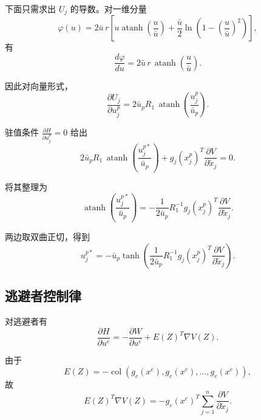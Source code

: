 \documentclass[12pt,a4paper]{ctexart}
\begin{document}
下面只需求出 $U_j$ 的导数。对一维分量
\begin{equation}
\varphi(u)
=
2\bar u\,r
\left[
u\operatorname{atanh}\!\left(\frac{u}{\bar u}\right)
+
\frac{\bar u}{2}\ln\!\left(1-\left(\frac{u}{\bar u}\right)^2\right)
\right],
\end{equation}
有
\begin{equation}
\frac{d\varphi}{du}
=
2\bar u\,r\,\operatorname{atanh}\!\left(\frac{u}{\bar u}\right).
\end{equation}

因此对向量形式，
\begin{equation}
\frac{\partial U_j}{\partial u_j^p}
=
2\bar u_p R_1\,\operatorname{atanh}\!\left(\frac{u_j^p}{\bar u_p}\right).
\end{equation}

驻值条件 $\frac{\partial H}{\partial u_j^p}=0$ 给出
\begin{equation}
2\bar u_p R_1\,\operatorname{atanh}\!\left(\frac{u_j^{p*}}{\bar u_p}\right)
+
g_j(x_j^p)^T\frac{\partial V}{\partial \tilde x_j}
=0.
\end{equation}

将其整理为
\begin{equation}
\operatorname{atanh}\!\left(\frac{u_j^{p*}}{\bar u_p}\right)
=
-\frac{1}{2\bar u_p}
R_1^{-1}
g_j(x_j^p)^T
\frac{\partial V}{\partial \tilde x_j}.
\end{equation}

两边取双曲正切，得到
\begin{equation}
u_j^{p*}
=
-\bar u_p
\tanh\!\left(
\frac{1}{2\bar u_p}
R_1^{-1}
g_j(x_j^p)^T
\frac{\partial V}{\partial \tilde x_j}
\right).
\end{equation}

\subsection{逃避者控制律}

对逃避者有
\begin{equation}
\frac{\partial H}{\partial u^e}
=
-\frac{\partial W}{\partial u^e}
+
E(Z)^T\nabla V(Z).
\end{equation}

由于
\begin{equation}
E(Z)=-\operatorname{col}(g_e(x^e),g_e(x^e),\dots,g_e(x^e)),
\end{equation}
故
\begin{equation}
E(Z)^T\nabla V(Z)
=
-g_e(x^e)^T
\sum_{j=1}^{n}\frac{\partial V}{\partial \tilde x_j}.
\end{equation}
\end{document}
